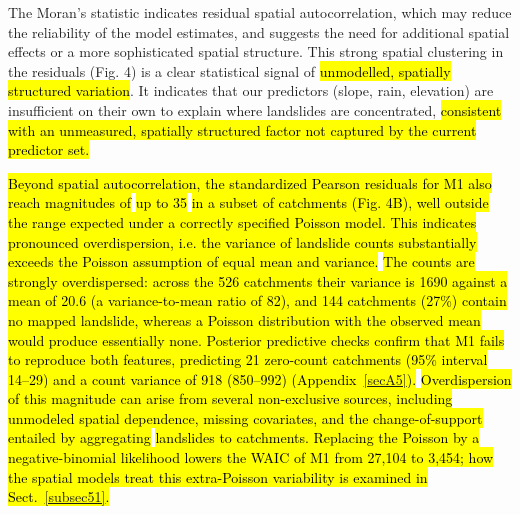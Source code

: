 \documentclass[journal abbreviation, manuscript]{copernicus}
\newcommand{\hlE}[1]{{\sethlcolor{edcyan}\hl{#1}}}
\begin{document}
The Moran’s statistic indicates residual spatial autocorrelation, which may reduce the reliability of the model estimates, and suggests the need for additional spatial effects or a more sophisticated spatial structure. 
This strong spatial clustering in the residuals (Fig. 4) is a clear statistical signal of \hlE{unmodelled, spatially structured variation}. 
It indicates that our predictors (slope, rain, elevation) are insufficient on their own to explain where landslides are concentrated, \hl{consistent with an unmeasured, spatially structured factor not captured by the current predictor set.}

\hl{Beyond spatial autocorrelation, the standardized Pearson residuals for M1 also reach magnitudes of} \hlE{up to 35} \hl{in a subset of catchments (Fig. 4B), well outside the range expected under a correctly specified Poisson model. 
This indicates pronounced overdispersion, i.e. the variance of landslide counts substantially exceeds the Poisson assumption of equal mean and variance.} 
\hlE{The counts are strongly overdispersed: across the 526 catchments their variance is 1690 against a mean of 20.6 (a variance-to-mean ratio of 82), and 144 catchments (27\%) contain no mapped landslide, whereas a Poisson distribution with the observed mean would produce essentially none. Posterior predictive checks confirm that M1 fails to reproduce both features, predicting 21 zero-count catchments (95\% interval 14--29) and a count variance of 918 (850--992) (\mbox{Appendix~\ref{secA5}}).} \hl{Overdispersion of this magnitude can arise from several non-exclusive sources, including unmodeled spatial dependence, missing covariates, and the change-of-support entailed by aggregating} \hlE{landslides to catchments. Replacing the Poisson by a negative-binomial likelihood lowers the WAIC of M1 from 27,104 to 3,454; how the spatial models treat this extra-Poisson variability is examined in \mbox{Sect.~\ref{subsec51}}.}
\end{document}
